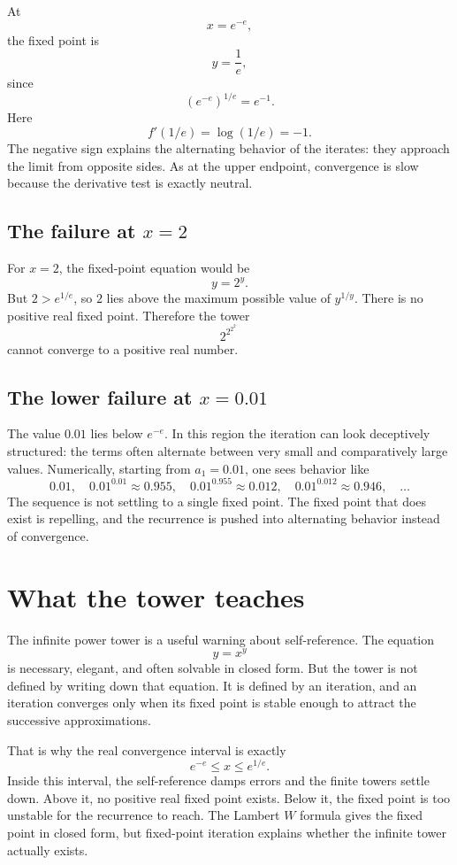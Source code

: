 \documentclass{essay}
\begin{document}
At
\[ x=e^{-e}, \]
the fixed point is
\[ y=\frac{1}{e}, \]
since
\[ \left(e^{-e}\right)^{1/e}=e^{-1}. \]
Here
\[ f'(1/e)=\log(1/e)=-1. \]
The negative sign explains the alternating behavior of the iterates: they
approach the limit from opposite sides. As at the upper endpoint, convergence
is slow because the derivative test is exactly neutral.

\subsection*{The failure at \(x=2\)}

For \(x=2\), the fixed-point equation would be
\[ y=2^{y}. \]
But \(2>e^{1/e}\), so \(2\) lies above the maximum possible value of
\(y^{1/y}\). There is no positive real fixed point. Therefore the tower
\[ 2^{2^{2^{2^{\cdots}}}} \]
cannot converge to a positive real number.

\subsection*{The lower failure at \(x=0.01\)}

The value \(0.01\) lies below \(e^{-e}\). In this region the iteration can
look deceptively structured: the terms often alternate between very small
and comparatively large values. Numerically, starting from \(a_{1}=0.01\),
one sees behavior like
\[ 0.01,\quad 0.01^{0.01}\approx0.955,\quad 0.01^{0.955}\approx0.012,\quad 0.01^{0.012}\approx0.946,\quad\ldots \]
The sequence is not settling to a single fixed point. The fixed point that
does exist is repelling, and the recurrence is pushed into alternating
behavior instead of convergence.

\section{What the tower teaches}

The infinite power tower is a useful warning about self-reference. The equation
\[ y=x^{y} \]
is necessary, elegant, and often solvable in closed form. But the tower is not
defined by writing down that equation. It is defined by an iteration, and an
iteration converges only when its fixed point is stable enough to attract the
successive approximations.

That is why the real convergence interval is exactly
\[ e^{-e}\le x\le e^{1/e}. \]
Inside this interval, the self-reference damps errors and the finite towers
settle down. Above it, no positive real fixed point exists. Below it, the
fixed point is too unstable for the recurrence to reach. The Lambert \(W\)
formula gives the fixed point in closed form, but fixed-point iteration
explains whether the infinite tower actually exists.
\end{document}
